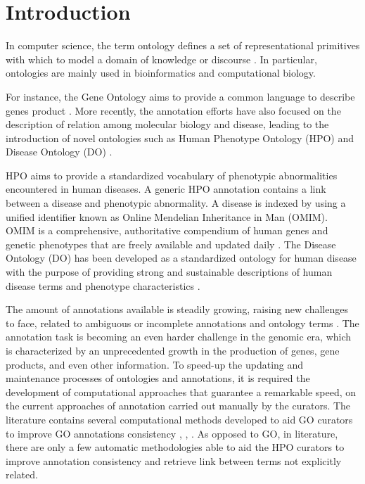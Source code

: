 \documentclass{article}
\theoremstyle{definition}
\begin{document}


\section{Introduction}
\label{sec:Intro}



In computer science, the term ontology defines a set of representational primitives with which to model a domain of knowledge or discourse \cite{gruber2009ontology}. In particular, ontologies are mainly used in bioinformatics and computational biology.

For instance, the Gene Ontology aims to provide a common language to describe genes product \cite{gene2004gene}. More recently, the annotation efforts have also focused on the description of relation among molecular biology and disease, leading to the introduction of novel ontologies such as Human Phenotype Ontology (HPO) \cite{} and Disease Ontology (DO) \cite{}.

HPO aims to provide a standardized vocabulary of phenotypic abnormalities encountered in human diseases. A generic HPO annotation contains a link between a disease and phenotypic abnormality. A disease is indexed by using a unified identifier known as Online Mendelian Inheritance in Man (OMIM). OMIM is a comprehensive, authoritative compendium of human genes and genetic phenotypes that are freely available and updated daily \cite{hamosh2005online}. The Disease Ontology (DO) has been developed as a standardized ontology for human disease with the purpose of providing strong and sustainable descriptions of human disease terms and phenotype characteristics \cite{schriml2012disease}. 


The amount of annotations available is steadily growing, raising new challenges to face, related to ambiguous or incomplete annotations and ontology terms \cite{flouris2006inconsistencies}. The annotation task is becoming an even harder challenge in the genomic era, which is characterized by an unprecedented growth in the production of genes, gene products, and even other information. To speed-up the updating and maintenance processes of ontologies and annotations, it is required the development of computational approaches that guarantee a remarkable speed, on the current approaches of annotation carried out manually by the curators. 
The literature contains several computational methods developed to aid GO curators to improve GO annotations consistency \cite{yeh2003knowledge}, \cite{10.1371/journal.pone.0040519}, \cite{manda2012cross}. As opposed to GO, in literature, there are only a few automatic methodologies able to aid the HPO curators to improve annotation consistency and retrieve link between terms not explicitly related.  
\end{document}
